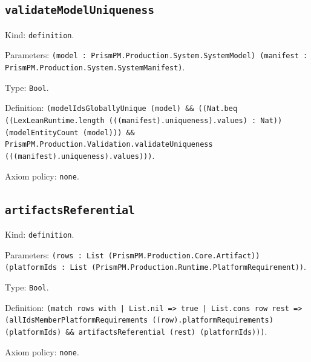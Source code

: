 \documentclass[11pt]{article}
\begin{document}
\subsection*{\texttt{validateModelUniqueness}}
\noindent Kind: \texttt{definition}.\par
\noindent Parameters: \texttt{(model : PrismPM.Production.System.SystemModel) (manifest : PrismPM.Production.System.SystemManifest)}.\par
\noindent Type: \texttt{Bool}.\par
\noindent Definition: \texttt{(modelIdsGloballyUnique (model) \&\& ((Nat.beq ((LexLeanRuntime.length (((manifest).uniqueness).values) : Nat)) (modelEntityCount (model))) \&\& PrismPM.Production.Validation.validateUniqueness (((manifest).uniqueness).values)))}.\par
\noindent Axiom policy: \texttt{none}.\par
\subsection*{\texttt{artifactsReferential}}
\noindent Kind: \texttt{definition}.\par
\noindent Parameters: \texttt{(rows : List (PrismPM.Production.Core.Artifact)) (platformIds : List (PrismPM.Production.Runtime.PlatformRequirement))}.\par
\noindent Type: \texttt{Bool}.\par
\noindent Definition: \texttt{(match rows with | List.nil => true | List.cons row rest => (allIdsMemberPlatformRequirements ((row).platformRequirements) (platformIds) \&\& artifactsReferential (rest) (platformIds)))}.\par
\noindent Axiom policy: \texttt{none}.\par
\end{document}

